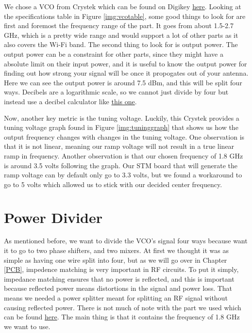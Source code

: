 We chose a VCO from Crystek which can be found on Digikey \href{https://www.digikey.com/en/products/detail/crystek-corporation/CVCO55BE-1530-2700/1644030}{here}.
Looking at the specifications table in Figure \ref{img:vcotable}, some good things to look for are first and foremost the frequency
range of the part. It goes from about 1.5-2.7 GHz, which is a pretty wide range and would support a lot of other parts as it also
covers the Wi-Fi band. The second thing to look for is output power. The output power can be a constraint for other parts, since they
might have a absolute limit on their input power, and it is useful to know the output power for finding out how strong your signal will be
once it propogates out of your antenna. Here we can see the output power is around 7.5 dBm, and this will be split four ways. 
Decibels are a logarithmic scale, so we cannot just divide by four but instead use a decibel calculator like \href{https://noisetools.net/decibelcalculator}{this one}.

Now, another key metric is the tuning voltage. Luckily, this Crystek provides a tuning voltage graph found in Figure \ref{img:tuninggraph}
that shows us how the output frequency changes with changes in the tuning voltage. One observation is that it is not linear, meaning
our ramp voltage will not result in a true linear ramp in frequency. Another observation is that our chosen frequency of 1.8 GHz is
around 3.5 volts following the graph. Our STM board that will generate the ramp voltage can by default only go to 3.3 volts, but we
found a workaround to go to 5 volts which allowed us to stick with our decided center frequency.

\section{Power Divider}
As mentioned before, we want to divide the VCO's signal four ways because want it to go to two phase shifters, and two mixers.
At first we thought it was as simple as having one wire split into four, but as we will go over in Chapter \ref{PCB}, impedence
matching is very important in RF circuits. To put it simply, impedance matching ensures that no power is reflected, and this is
important because reflected power means distortions in the signal and power loss. That means we needed a power splitter meant for
splitting an RF signal without causing reflected power. There is not much of note with the part we used which can be found 
\href{https://www.mouser.com/ProductDetail/Mini-Circuits/WP4P1%2B?qs=Imq1NPwxi77kWybHhilv%2Fg%3D%3D}{here}. The main thing is that
it contains the frequency of 1.8 GHz we want to use.


